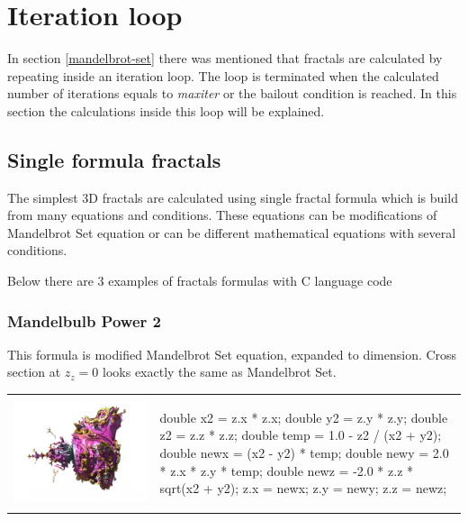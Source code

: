 \section{Iteration loop}\label{iteration-loop}

In section \ref{mandelbrot-set} there was mentioned that fractals are calculated
by repeating inside an iteration loop. The loop is terminated when the calculated
number of iterations equals to \emph{maxiter} or the bailout condition is reached.
In this section the calculations inside this loop will be explained.

\subsection{Single formula fractals}\label{single-formula-fractals}

The simplest 3D fractals are calculated using single fractal formula which is
build from many equations and conditions. These equations can be modifications
of Mandelbrot Set equation or can be different mathematical equations with
several conditions.

Below there are 3 examples of fractals formulas with C language code

\subsubsection{Mandelbulb Power 2} \nopagebreak

This formula is modified Mandelbrot Set equation, expanded to  dimension.
Cross section at $ z_z = 0 $ looks exactly the same as Mandelbrot Set.
\nopagebreak

\begin{tabular}{l l}
	\includegraphics[width=0.3\linewidth]{img/manual/media/formula_mandelbulb_power_2}	
	& 
	\begin{minipage}[b]{0.5\linewidth}
		\begin{cppcode}
double x2 = z.x * z.x;
double y2 = z.y * z.y;
double z2 = z.z * z.z;
double temp = 1.0 - z2 / (x2 + y2);
double newx = (x2 - y2) * temp;
double newy = 2.0 * z.x * z.y * temp;
double newz = -2.0 * z.z * sqrt(x2 + y2);
z.x = newx;
z.y = newy;
z.z = newz;
		\end{cppcode}
	\end{minipage}
\end{tabular} 

